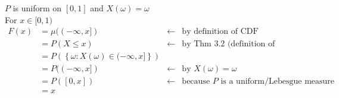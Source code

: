 \begin{example}
    $P$ is uniform on $[0,1]$ and $X(\omega)=\omega$
    \\For $x\in[0,1)$
    \begin{align*}
        F(x) &= \mu((-\infty, x]) & \leftarrow& \text{by definition of CDF} \\
        &= P(X \leq x) & \leftarrow& \text{by Thm 3.2 (definition of distribution)} \\
        &= P\left(\left\{\omega :X(\omega) \in (-\infty, x]\right\}\right) \\
        &= P((-\infty, x]) & \leftarrow& \text{by }X(\omega) = \omega \\
        &= P([0,x]) & \leftarrow& \text{because $P$ is a uniform/Lebesgue measure} \\
        &= x
    \end{align*}
\end{example}

